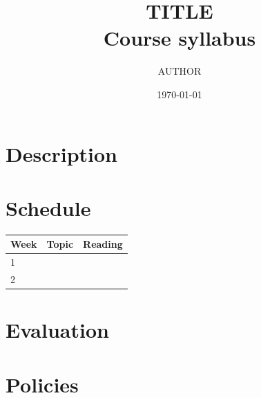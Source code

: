 \documentclass[11pt]{article}
\title{{{TITLE}}\\[4pt]\large Course syllabus}
\author{{{AUTHOR}}}
\date{\today}
\begin{document}
\maketitle
\section*{Description}
\section*{Schedule}
\begin{tabular}{lll}\toprule Week & Topic & Reading\\\midrule 1 & & \\ 2 & & \\\bottomrule\end{tabular}
\section*{Evaluation}
\section*{Policies}
\end{document}
